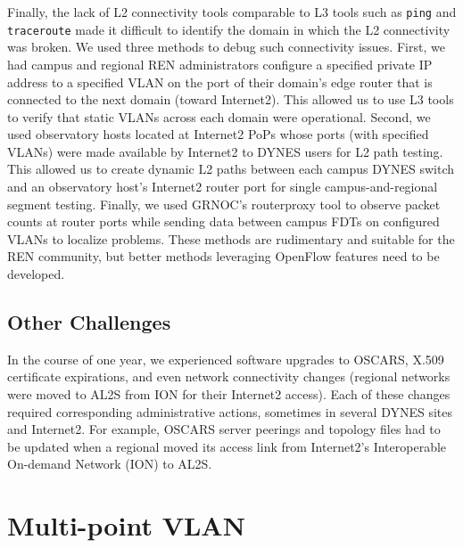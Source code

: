 {Finally, the lack of L2 connectivity tools comparable to L3 tools such as \texttt{ping} and \texttt{traceroute} made it difficult to identify the domain in which the L2 connectivity
was broken.
We used three methods to debug such connectivity issues. First, we had campus and regional REN administrators configure a specified private IP address to a specified VLAN on the port of their domain's edge router that is connected to the next domain (toward Internet2). This allowed us to use L3 tools
to verify that static VLANs across each domain were operational. Second, we used observatory hosts located at Internet2 PoPs whose ports (with specified VLANs) were made available by Internet2 to DYNES users for L2 path testing. This allowed us to create dynamic L2 paths between each campus DYNES switch and an observatory host's Internet2 router port for single campus-and-regional segment testing. Finally, we used GRNOC's routerproxy tool \cite{routerproxy} to observe packet counts at router ports while sending data between campus FDTs on configured VLANs to localize problems. These methods are rudimentary and suitable for the REN community,
but better methods leveraging OpenFlow features need to be developed.

\subsection{Other Challenges}
\label{sec:other-challenges}
In the course of one year, we experienced software upgrades to OSCARS,
X.509 certificate expirations, and even network connectivity changes (regional networks
were moved to AL2S from ION for their Internet2 access). Each of
these changes required corresponding administrative actions, sometimes in several
DYNES sites and Internet2. For example, OSCARS server peerings and topology
files had to be updated
when a regional moved its access link from Internet2's Interoperable On-demand Network (ION) to AL2S. 

\section{Multi-point VLAN}
\label{sec:mdvlan}}

